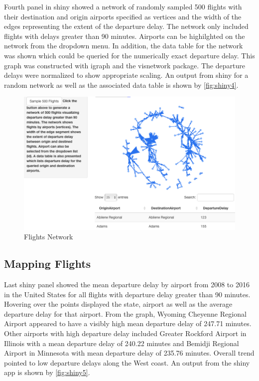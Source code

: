 \documentclass[12pt,twoside]{amherstthesis}
\begin{document}
  Fourth panel in shiny showed a network of randomly sampled 500 flights
  with their destination and origin airports specified as vertices and the
  width of the edges representing the extent of the departure delay. The
  network only included flights with delays greater than 90 minutes.
  Airports can be highilghted on the network from the dropdown menu. In
  addition, the data table for the network was shown which could be
  queried for the numerically exact departure delay. This graph was
  constructed with igraph and the visnetwork package. The departure delays
  were normalized to show appropriate scaling. An output from shiny for a
  random network as well as the associated data table is shown by
  \autoref{fig:shiny4}.
  
  \begin{figure}[htbp]
  \centering
  \includegraphics[scale = 0.5,angle = 0]{figure/Shiny4.png}
  \caption[Flights Network]{\normalsize{Flights Network}}
  \label{fig:shiny4}
  \end{figure}
  
  \clearpage
  
  \subsection{Mapping Flights}\label{mapping-flights}
  
  Last shiny panel showed the mean departure delay by airport from 2008 to
  2016 in the United States for all flights with departure delay greater
  than 90 minutes. Hovering over the points displayed the state, airport
  as well as the average departure delay for that airport. From the graph,
  Wyoming Cheyenne Regional Airport appeared to have a visibly high mean
  departure delay of 247.71 minutes. Other airports with high departure
  delay included Greater Rockford Airport in Illinois with a mean
  departure delay of 240.22 minutes and Bemidji Regional Airport in
  Minnesota with mean departure delay of 235.76 minutes. Overall trend
  pointed to low departure delays along the West coast. An output from the
  shiny app is shown by \autoref{fig:shiny5}.
  
\end{document}
